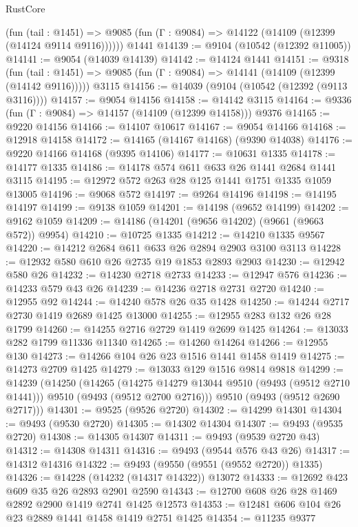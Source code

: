 \begin{lexlean}{RustCore}
\begin{coremodule}
      (fun (tail : @1451) =>
      @9085 (fun (Γ : @9084) => @14122 (@14109 (@12399 (@14124 @9114 @9116))))))
    @1441
@14139 := @9104 (@10542 (@12392 @11005))
@14141 := @9054 (@14039 @14139)
@14142 := @14124 @1441
@14151 := @9318
    (fun (tail : @1451) => @9085 (fun (Γ : @9084) => @14141 (@14109 (@12399 (@14142 @9116)))))
    @3115
@14156 := @14039 (@9104 (@10542 (@12392 (@9113 @3116))))
@14157 := @9054 @14156
@14158 := @14142 @3115
@14164 := @9336 (fun (Γ : @9084) => @14157 (@14109 (@12399 @14158))) @9376
@14165 := @9220 @14156
@14166 := @14107 @10617
@14167 := @9054 @14166
@14168 := @12918 @14158
@14172 := @14165 (@14167 @14168) (@9390 @14038)
@14176 := @9220 @14166 @14168 (@9395 @14106)
@14177 := @10631 @1335
@14178 := @14177 @1335
@14186 := @14178 @574 @611 @633 @26 @1441 @2684 @1441 @3115
@14195 := @12972 @572 @263 @28 @125 @1441 @1751 @1335 @1059 @13005
@14196 := @9068 @572
@14197 := @9264 @14196
@14198 := @14195 @14197
@14199 := @9138 @1059
@14201 := @14198 (@9652 @14199)
@14202 := @9162 @1059
@14209 := @14186 (@14201 (@9656 @14202) (@9661 (@9663 @572)) @9954)
@14210 := @10725 @1335
@14212 := @14210 @1335 @9567
@14220 := @14212 @2684 @611 @633 @26 @2894 @2903 @3100 @3113
@14228 := @12932 @580 @610 @26 @2735 @19 @1853 @2893 @2903
@14230 := @12942 @580 @26
@14232 := @14230 @2718 @2733
@14233 := @12947 @576
@14236 := @14233 @579 @43 @26
@14239 := @14236 @2718 @2731 @2720
@14240 := @12955 @92
@14244 := @14240 @578 @26 @35 @1428
@14250 := @14244 @2717 @2730 @1419 @2689 @1425 @13000
@14255 := @12955 @283 @132 @26 @28 @1799
@14260 := @14255 @2716 @2729 @1419 @2699 @1425
@14264 := @13033 @282 @1799 @11336 @11340
@14265 := @14260 @14264
@14266 := @12955 @130
@14273 := @14266 @104 @26 @23 @1516 @1441 @1458 @1419
@14275 := @14273 @2709 @1425
@14279 := @13033 @129 @1516 @9814 @9818
@14299 := @14239
    (@14250
      (@14265
        (@14275 @14279 @13044 @9510 (@9493 (@9512 @2710 @1441)))
        @9510
        (@9493 (@9512 @2700 @2716)))
      @9510
      (@9493 (@9512 @2690 @2717)))
@14301 := @9525 (@9526 @2720)
@14302 := @14299 @14301
@14304 := @9493 (@9530 @2720)
@14305 := @14302 @14304
@14307 := @9493 (@9535 @2720)
@14308 := @14305 @14307
@14311 := @9493 (@9539 @2720 @43)
@14312 := @14308 @14311
@14316 := @9493 (@9544 @576 @43 @26)
@14317 := @14312 @14316
@14322 := @9493 (@9550 (@9551 (@9552 @2720)) @1335)
@14326 := @14228 (@14232 (@14317 @14322)) @13072
@14333 := @12692 @423 @609 @35 @26 @2893 @2901 @2590
@14343 := @12700 @608 @26 @28 @1469 @2892 @2900 @1419 @2741 @1425 @12573
@14353 := @12481 @606 @104 @26 @23 @2889 @1441 @1458 @1419 @2751 @1425
@14354 := @11235 @9377

\end{coremodule}
\end{lexlean}
